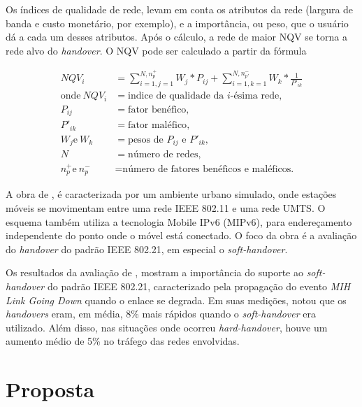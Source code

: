 \documentclass[12pt]{article}
\begin{document}
Os índices de qualidade de rede, levam em conta os atributos da rede (largura 
de banda e custo monetário, por exemplo), e a importância, ou peso, que o 
usuário dá a cada um desses atributos. Após o cálculo, a rede de maior NQV se 
torna a rede alvo do \textit{handover}. O NQV pode ser calculado a partir da 
fórmula

\begin{align*}
	NQV_i &= \sum_{i=1,j=1}^{N,n_p^+}W_j * P_{ij} + \sum_{i=1,k=1}^{N,n_{p'}^-}W_k * \frac{1}{P'_{ik}}\\
	\text{onde}~NQV_i &= \text{indice de qualidade da $i$-ésima rede}, \\
	P_{ij} &= \text{fator benéfico}, \\
	P'_{ik} &= \text{fator maléfico}, \\
	W_j \text{e}~W_k &= \text{pesos de $P_{ij}$ e $P'_{ik}$}, \\
	N &= \text{número de redes}, \\
	n_p^+ \text{e}~n_p^- &= \text{número de fatores benéficos e maléficos.}
\end{align*}


A obra de \cite{machan:2008}, é caracterizada por um ambiente urbano simulado, 
onde estações móveis se movimentam entre uma rede IEEE 802.11 e uma rede UMTS.  
O esquema também utiliza a tecnologia Mobile IPv6 (MIPv6), para endereçamento 
independente do ponto onde o móvel está conectado. O foco da obra é a 
avaliação do \textit{handover} do padrão IEEE 802.21, em especial o 
\textit{soft-handover}.

Os resultados da avaliação de \cite{machan:2008}, mostram a importância do 
suporte ao \textit{soft-handover} do padrão IEEE 802.21, caracterizado pela 
propagação do evento \textit{MIH Link Going Down} quando o enlace se degrada.
Em suas medições, \cite{machan:2008} notou que os \textit{handovers} eram, em 
média, 8\% mais rápidos quando o \textit{soft-handover} era utilizado. Além 
disso, nas situações onde ocorreu \textit{hard-handover}, houve um aumento 
médio de 5\% no tráfego das redes envolvidas.



\section{Proposta} \label{sec:proposta} %
\end{document}
